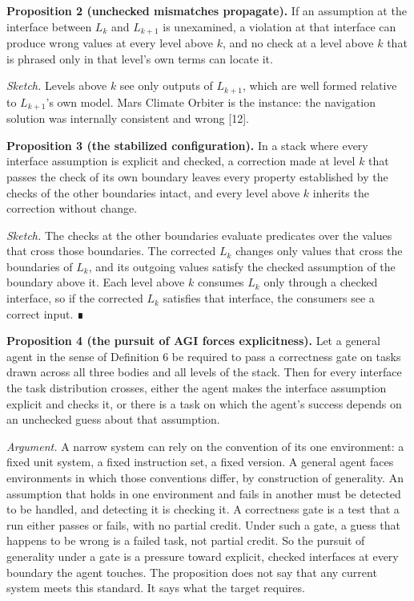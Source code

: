\documentclass[
  10pt,
]{article}
\begin{document}
\textbf{Proposition 2 (unchecked mismatches propagate).} If an
assumption at the interface between \(L_k\) and \(L_{k+1}\) is
unexamined, a violation at that interface can produce wrong values at
every level above \(k\), and no check at a level above \(k\) that is
phrased only in that level's own terms can locate it.

\emph{Sketch.} Levels above \(k\) see only outputs of \(L_{k+1}\), which
are well formed relative to \(L_{k+1}\)'s own model. Mars Climate
Orbiter is the instance: the navigation solution was internally
consistent and wrong {[}12{]}.

\textbf{Proposition 3 (the stabilized configuration).} In a stack where
every interface assumption is explicit and checked, a correction made at
level \(k\) that passes the check of its own boundary leaves every
property established by the checks of the other boundaries intact, and
every level above \(k\) inherits the correction without change.

\emph{Sketch.} The checks at the other boundaries evaluate predicates
over the values that cross those boundaries. The corrected \(L_k\)
changes only values that cross the boundaries of \(L_k\), and its
outgoing values satisfy the checked assumption of the boundary above it.
Each level above \(k\) consumes \(L_k\) only through a checked
interface, so if the corrected \(L_k\) satisfies that interface, the
consumers see a correct input. ∎

\textbf{Proposition 4 (the pursuit of AGI forces explicitness).} Let a
general agent in the sense of Definition 6 be required to pass a
correctness gate on tasks drawn across all three bodies and all levels
of the stack. Then for every interface the task distribution crosses,
either the agent makes the interface assumption explicit and checks it,
or there is a task on which the agent's success depends on an unchecked
guess about that assumption.

\emph{Argument.} A narrow system can rely on the convention of its one
environment: a fixed unit system, a fixed instruction set, a fixed
version. A general agent faces environments in which those conventions
differ, by construction of generality. An assumption that holds in one
environment and fails in another must be detected to be handled, and
detecting it is checking it. A correctness gate is a test that a run
either passes or fails, with no partial credit. Under such a gate, a
guess that happens to be wrong is a failed task, not partial credit. So
the pursuit of generality under a gate is a pressure toward explicit,
checked interfaces at every boundary the agent touches. The proposition
does not say that any current system meets this standard. It says what
the target requires.
\end{document}
